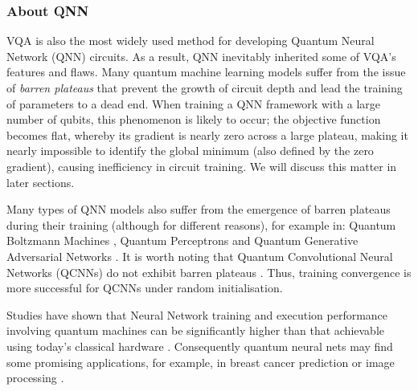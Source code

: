 \subsubsection{About QNN}
VQA is also the most widely used method for developing Quantum Neural Network (QNN) circuits. 
As a result, QNN inevitably inherited some of VQA's features and flaws.
Many quantum machine learning models suffer from the issue of \textit{barren plateaus} \cite{zhaoReviewQuantumNeural2021} that prevent the growth of circuit depth and lead the training of parameters to a dead end.
When training a QNN framework with a large number of qubits, this phenomenon is likely to occur; the objective function becomes flat, whereby its gradient is nearly zero across a large plateau, making it nearly impossible to identify the global minimum (also defined by the zero gradient), \cite{mccleanBarrenPlateausQuantum2018, zhaoAnalyzingBarrenPlateau2021} causing inefficiency in circuit training. 
We will discuss this matter in later sections.


Many types of QNN models also suffer from the emergence of barren plateaus during their training (although for different reasons), for example in: 
Quantum Boltzmann Machines \cite{shinguBoltzmannMachineLearning2021, zoufalVariationalQuantumBoltzmann2021}, 
Quantum Perceptrons \cite{kristensenArtificialSpikingQuantum2021} and
Quantum Generative Adversarial Networks \cite{dallaire-demersQuantumGenerativeAdversarial2018, lloydQuantumGenerativeAdversarial2018}. 
It is worth noting that Quantum Convolutional Neural Networks (QCNNs) do not exhibit barren plateaus \cite{pesahAbsenceBarrenPlateaus2021}.
Thus, training convergence is more successful for QCNNs under random initialisation.

Studies have shown that Neural Network training and execution performance involving quantum machines can be significantly higher than that achievable using today's classical hardware \cite{abbasPowerQuantumNeural2021, colesSeekingQuantumAdvantage2021}. Consequently quantum neural nets may find some promising applications, for example, in breast cancer prediction \cite{liModelAlgorithmQuantuminspired2014} or image processing \cite{matsuiQubitNeuralNetwork2009}.